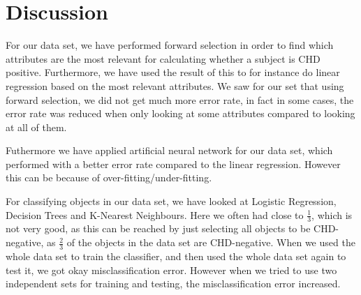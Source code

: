 \section{Discussion}

For our data set, we have performed forward selection in order to find which attributes are the most relevant for calculating whether a subject is CHD positive. Furthermore, we have used the result of this to for instance do linear regression based on the most relevant attributes. We saw for our set that using forward selection, we did not get much more error rate, in fact in some cases, the error rate was reduced when only looking at some attributes compared to looking at all of them.


Futhermore we have applied artificial neural network for our data set, which performed with a better error rate compared to the linear regression. However this can be because of over-fitting/under-fitting.

For classifying objects in our data set, we have looked at Logistic Regression, Decision Trees and K-Nearest Neighbours. Here we often had close to $\frac{1}{3}$, which is not very good, as this can be reached by just selecting all objects to be CHD-negative, as $\frac{2}{3}$ of the objects in the data set are CHD-negative. When we used the whole data set to train the classifier, and then used the whole data set again to test it, we got okay misclassification error. However when we tried to use two independent sets for training and testing, the misclassification error increased.